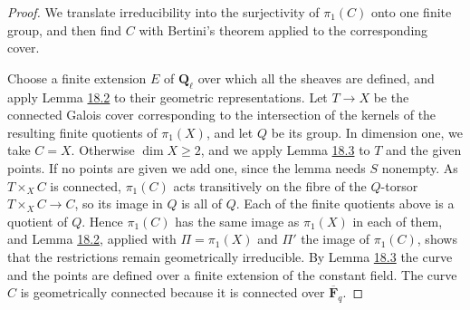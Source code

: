 \documentclass[11pt]{article}
\begin{document}
\begin{proof}[{Proof}]\label{bp285}%
We translate irreducibility into the surjectivity of \(\pi_1(C)\) onto one finite group, and then find \(C\) with Bertini's theorem applied to the corresponding cover.

Choose a finite extension \(E\) of \(\mathbf Q_\ell\) over which all the sheaves are defined, and apply Lemma \hyperref[bp278]{18.2} to their geometric representations. Let \(T\to X\) be the connected Galois cover corresponding to the intersection of the kernels of the resulting finite quotients of \(\pi_1(X)\), and let \(Q\) be its group. In dimension one, we take \(C=X\). Otherwise \(\dim X\ge2\), and we apply Lemma \hyperref[bp281]{18.3} to \(T\) and the given points. If no points are given we add one, since the lemma needs \(S\) nonempty. As \(T\times_XC\) is connected, \(\pi_1(C)\) acts transitively on the fibre of the \(Q\)-torsor \(T\times_XC\to C\), so its image in \(Q\) is all of \(Q\). Each of the finite quotients above is a quotient of \(Q\). Hence \(\pi_1(C)\) has the same image as \(\pi_1(X)\) in each of them, and Lemma \hyperref[bp278]{18.2}, applied with \(\Pi=\pi_1(X)\) and \(\Pi'\) the image of \(\pi_1(C)\), shows that the restrictions remain geometrically irreducible. By Lemma \hyperref[bp281]{18.3} the curve and the points are defined over a finite extension of the constant field. The curve \(C\) is geometrically connected because it is connected over \(\overline{\mathbf F}_q\).
\end{proof}


\end{document}
